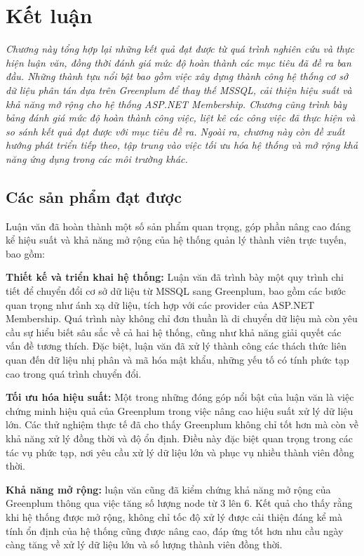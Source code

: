 
\section{Kết luận}

\textit{Chương này tổng hợp lại những kết quả đạt được từ quá trình nghiên cứu và thực hiện luận văn, đồng thời đánh giá mức độ hoàn thành các mục tiêu đã đề ra ban đầu. Những thành tựu nổi bật bao gồm việc xây dựng thành công hệ thống cơ sở dữ liệu phân tán dựa trên Greenplum để thay thế MSSQL, cải thiện hiệu suất và khả năng mở rộng cho hệ thống ASP.NET Membership. Chương cũng trình bày bảng đánh giá mức độ hoàn thành công việc, liệt kê các công việc đã thực hiện và so sánh kết quả đạt được với mục tiêu đề ra. Ngoài ra, chương này còn đề xuất hướng phát triển tiếp theo, tập trung vào việc tối ưu hóa hệ thống và mở rộng khả năng ứng dụng trong các môi trường khác.}

\subsection{Các sản phẩm đạt được}

Luận văn đã hoàn thành một số sản phẩm quan trọng, góp phần nâng cao đáng kể hiệu suất và khả năng mở rộng của hệ thống quản lý thành viên trực tuyến, bao gồm:

\textbf{Thiết kế và triển khai hệ thống:} Luận văn đã trình bày một quy trình chi tiết để chuyển đổi cơ sở dữ liệu từ MSSQL sang Greenplum, bao gồm các bước quan trọng như ánh xạ dữ liệu, tích hợp với các provider của ASP.NET Membership. Quá trình này không chỉ đơn thuần là di chuyển dữ liệu mà còn yêu cầu sự hiểu biết sâu sắc về cả hai hệ thống, cũng như khả năng giải quyết các vấn đề tương thích. Đặc biệt, luận văn đã xử lý thành công các thách thức liên quan đến dữ liệu nhị phân và mã hóa mật khẩu, những yếu tố có tính phức tạp cao trong quá trình chuyển đổi.

\textbf{Tối ưu hóa hiệu suất:} Một trong những đóng góp nổi bật của luận văn là việc chứng minh hiệu quả của Greenplum trong việc nâng cao hiệu suất xử lý dữ liệu lớn. Các thử nghiệm thực tế đã cho thấy Greenplum không chỉ tốt hơn mà còn về khả năng xử lý đồng thời và độ ổn định. Điều này đặc biệt quan trọng trong các tác vụ phức tạp, nơi yêu cầu xử lý dữ liệu lớn và phục vụ nhiều thành viên đồng thời.

\textbf{Khả năng mở rộng:} luận văn cũng đã kiểm chứng khả năng mở rộng của Greenplum thông qua việc tăng số lượng node từ 3 lên 6. Kết quả cho thấy rằng khi hệ thống được mở rộng, không chỉ tốc độ xử lý được cải thiện đáng kể mà tính ổn định của hệ thống cũng được nâng cao, đáp ứng tốt hơn nhu cầu ngày càng tăng về xử lý dữ liệu lớn và số lượng thành viên đồng thời.

